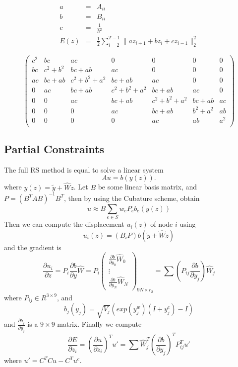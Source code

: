 \documentclass[9pt,twocolumn]{extarticle}
\begin{document}
\begin{eqnarray*}
  a &=& A_{ii}\\
  b &=& B_{ii}\\
  c &=& \frac{1}{h^2}\\
  E(z)  &=& \frac{1}{2}\sum_{i=2}^{T-1}\|az_{i+1}+bz_i+cz_{i-1}\|_2^2
\end{eqnarray*}

\[
\left( \begin{array}{ccccccc}
    c^2&bc&ac&0&0&0&0\\
    bc&c^2+b^2&bc+ab&ac&0&0&0\\
    ac&bc+ab&c^2+b^2+a^2&bc+ab&ac&0&0\\
    0&ac&bc+ab&c^2+b^2+a^2&bc+ab&ac&0\\
    0&0&ac&bc+ab&c^2+b^2+a^2&bc+ab&ac\\
    0&0&0&ac&bc+ab&b^2+a^2&ab\\
    0&0&0&0&ac&ab&a^2\\
  \end{array} \right)
\]

\subsection{Partial Constraints}
The full RS method is equal to solve a linear system
\begin{equation} \label{rs}
  Au = b(y(z)).
\end{equation}
where $y(z) = \tilde{y} + \hat{W}z$. Let $B$ be some linear basis matrix, and
$P=(B^TAB)^{-1}B^T$, then by using the Cubature scheme, obtain
\begin{equation} \label{reduced_rs3}
  u \approx B\sum_{e\in{S}}w_eP_e{b_e(y(z))}
\end{equation}
Then we can compute the displacement $u_i(z)$ of node $i$ using
\begin{equation}
  u_i(z) = (B_iP)b(\tilde{y} + \hat{W}z)
\end{equation}
and the gradient is
\begin{equation}
  \frac{\partial{u_i}}{\partial{z}} = P_i \frac{\partial{b}}{\partial{y}}
  \hat{W} = P_i
  \left( \begin{array}{c}
      \frac{\partial{b}}{\partial{y_0}} \hat{W}_0\\
      \vdots\\
      \frac{\partial{b}}{\partial{y_N}} \hat{W}_N
    \end{array} \right)_{9N\times r_2} = 
  \sum(P_{ij}\frac{\partial{b}}{\partial{y_j}})\hat{W}_j
\end{equation}
where $P_{ij}\in R^{3\times 9}$, and
\begin{equation}
  b_j(y_j) = \sqrt{V_j}(exp(y_j^w)(I+y_j^e)-I)
\end{equation}
and $\frac{\partial{b_j}}{\partial{y_j}}$ is a $9\times9$ matrix. Finally we
compute 
\begin{equation} \label{compPePz}
  {\frac{\partial{E}}{\partial{z_i}}} =
  (\frac{\partial{u}}{\partial{z_i}})^Tu' =
  \sum\hat{W}_j^T(\frac{\partial{b}}{\partial{y_j}})^TP_{ij}^Tu'
\end{equation}
where $u' = C^TCu-C^Tu^c$.
\end{document}
